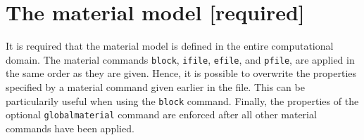 \documentclass[11pt]{report}
\begin{document}
\section{The material model [required]} 

It is required that the material model is defined in the entire computational domain.
The material commands \verb+block+, \verb+ifile+, \verb+efile+, and \verb+pfile+, are applied in the
same order as they are given. Hence, it is possible to overwrite the properties specified by a
material command given earlier in the file. This can be particularily useful when using the
\verb+block+ command. Finally, the properties of the optional \verb+globalmaterial+ command are
enforced after all other material commands have been applied.

\end{document}
